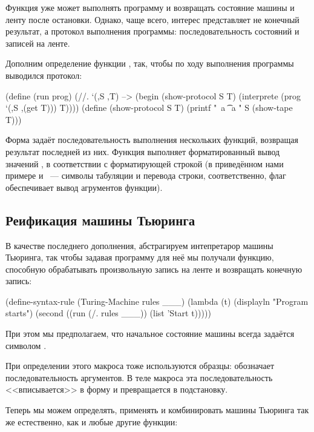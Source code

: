 Функция  уже может выполнять программу и возвращать состояние машины и ленту после остановки. Однако, чаще всего, интерес представляет не конечный результат, а протокол выполнения программы: последовательность состояний и записей на ленте.

Дополним определение функции , так, чтобы по ходу выполнения программы выводился протокол:
\begin{Definition}[emph={S,T,prog}]
(define (run prog)
  (//. `(,S ,T) --> (begin
                      (show-protocol S T)
                      (interprete (prog `(,S ,(get T))) T))))%
(define (show-protocol S T)
  (printf "~a \t ~a \n" S (show-tape T)))
\end{Definition}

Форма  задаёт последовательность выполнения нескольких функций, возвращая результат последней из них. Функция  выполняет форматированный вывод значений , в соответствии с форматирующей строкой  (в приведённом нами примере  и ~--- символы табуляции и перевода строки, соответственно, флаг  обеспечивает вывод агрументов функции).

\subsection*{Реификация машины Тьюринга}
В качестве последнего дополнения, абстрагируем интепретарор машины Тьюринга, так чтобы задавая программу для неё мы получали функцию, способную обрабатывать произвольную запись на ленте и возвращать конечную запись:

\begin{Definition}[emph={l,rules}]
(define-syntax-rule (Turing-Machine rules ___)
  (lambda (t)
    (displayln "Program starts")
    (second ((run (/. rules ___)) (list 'Start t)))))
\end{Definition}

\noindent При этом мы предполагаем, что начальное состояние машины всегда задаётся символом . 

При определении этого макроса тоже используются образцы:  обозначает последовательность аргументов. В теле макроса эта последовательность <<вписывается>> в форму  и превращается в подстановку.

Теперь мы можем определять, применять и комбинировать машины Тьюринга так же естественно, как и любые другие функции:

